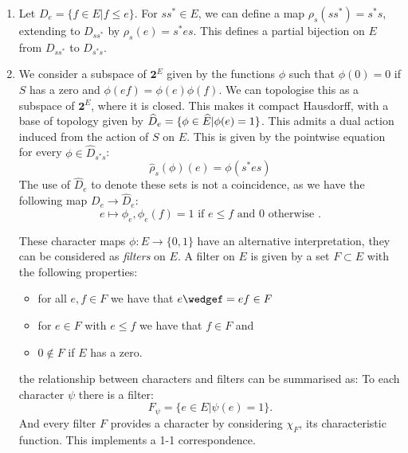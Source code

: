 \begin{definition}

\begin{enumerate}
\item Let $D_{e}=\lbrace f \in E | f \leq e \rbrace$. For $ss^{*} \in E$, we can define a map $\rho_{s}(ss^{*})=s^{*}s$, extending to $D_{ss^{*}}$ by $\rho_{s}(e) = s^{*}es$. This defines a partial bijection on $E$ from $D_{ss^{*}}$ to $D_{s^{*}s}$. 

\item We consider a subspace of $\textbf{2}^{E}$ given by the functions $\phi$ such that $\phi(0)=0$ if $S$ has a zero and $\phi(ef)=\phi(e)\phi(f)$. We can topologise this as a subspace of $\textbf{2}^{E}$, where it is closed. This makes it compact Hausdorff, with a base of topology given by $\widehat{D}_{e}= \lbrace \phi \in \widehat{E} | \phi(e)=1 \rbrace$. This admits a dual action induced from the action of $S$ on $E$. This is given by the pointwise equation for every $\phi \in \widehat{D}_{s^{*}s}$:
\begin{equation*}
\widehat{\rho}_{s}(\phi)(e)=\phi(s^{*}es)
\end{equation*}
The use of $\widehat{D}_{e}$ to denote these sets is not a coincidence, as we have the following map $D_{e} \rightarrow \widehat{D}_{e}$:
\begin{equation*}
e \mapsto \phi_{e}, \phi_{e}(f)=1 \mbox{ if } e \leq f \mbox{ and } 0 \mbox{ otherwise }.
\end{equation*}
\begin{remark}
These character maps $\phi: E \rightarrow \lbrace 0,1 \rbrace$ have an alternative interpretation, they can be considered as \textit{filters} on $E$. A filter on $E$ is given by a set $F \subset E$ with the following properties:
\begin{itemize}
\item for all $e,f \in F$ we have that $e\wedgef=ef \in F$
\item for $e\in F$ with $e \leq f$ we have that $f \in F$ and
\item $0 \not\in F$ if $E$ has a zero.
\end{itemize}
the relationship between characters and filters can be summarised as: To each character $\psi$ there is a filter:
\begin{equation*}
F_{\psi}= \lbrace e \in E | \psi(e)=1 \rbrace.
\end{equation*}
And every filter $F$ provides a character by considering $\chi_{F}$, its characteristic function. This implements a 1-1 correspondence.
\end{remark}


\end{enumerate}
\end{definition}
